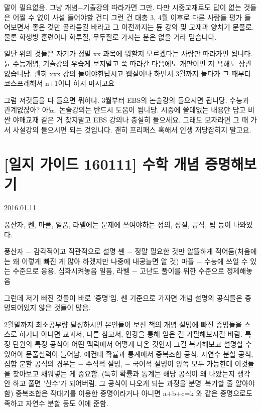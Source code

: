 말이 필요없음. 그냥 개념$-$기출강의 따라가면 그만.
다만 시중교재로도 답이 없는 것들은 어쩔 수 없이 사설 들어야할 건디
그런 건 대충 3, 4월 이후로 다른 사람들 평가 들어보면서 좋은 것만 골라듣길 바라고
그 이전까지는 듄 강의 및 교재과 양치기 문풀로.
물론 화생방 훈련이나 화투질, 무두질로 가시는 분은 없을 거라 믿습니다.
\vspace{5mm}

일단 위의 것들은 자기가 정말 xx 과목에 뭐할지 모르겠다는 사람만 따라가면 됩니다.
듄 수능개념, 기출강의 우습게 보지말고 쭉 따라간 다음에도 개판이면 저 욕해도 상관없습니당.
괜히 xxx 강의 들어야한답시고 웹질이나 하면서 3월까지 놀다가 그 때부터 코스프레해서 n+1이나 하지 마시고요
\vspace{5mm}

그럼 저것들을 다 들으면 뭐하냐.
3월부터 EBS의 논술강의 들으시면 됩니당.
수능과 관계없잖아?
아뇨. 논술강의는 반드시 도움이 됩니당.
시중에 쓸데없는 내용만 담고 비싼 야매교재 같은 거 찾지말고 EBS 강의나 충실히 들으세요.
그래도 모자라면 그 때 가서 사설강의 들으시면 되는 것입니다. 괜히 프리패스 혹해서 인생 저당잡히지 말고요.
\vspace{5mm}









\section{[일지 가이드 160111] 수학 개념 증명해보기}
\href{https://www.kockoc.com/Apoc/584086}{2016.01.11}

\vspace{5mm}

풍산자, 쎈, 마플, 일품, 라벨에는 문제에 쓰여야하는 정의, 성질, 공식, 팁 등이 나와있다.
\vspace{5mm}

풍산자 $-$ 감각적이고 직관적으로 설명
쎈 $-$ 정말 필요한 것만 알뜰하게 적어둠(처음에는 왜 이렇게 빠진 게 많아 하겠지만 나중에 내공늘면 알 것)
마플 $-$ 수능에 쓰일 수 있는 수준으로 응용, 심화시켜놓음
일품, 라벨 $-$ 고난도 풀이를 위한 수준으로 정제해놓음
\vspace{5mm}

그런데 저기 빠진 것들이 바로 '증명'임.
쎈 기준으로 가자면 개념 설명의 공식들은 증명되어있지 않은 것들이 많음.
\vspace{5mm}

2월말까지 최소공부량 달성하시면
본인들이 보신 책의 개념 설명에 빠진 증명들을 스스로 하거나 아니면 교과서, 다른 참고서, 인강을 통해 얻은 걸 가필해보시길 바람.
특정 단원의 특정 공식이 어떤 맥락에서 어떻게 나온 것인지 그걸 복기해보고 설명할 수 있어야 문풀실력이 늘어남.
예컨대 확률과 통계에서 중복조합 공식, 자연수 분할 공식, 집합 분할 공식의 경우는
$-$ 수식적 설명, $-$ 국어적 설명이 양쪽 모두 가능한데 이것들을 찾아보고 채워넣는 게 중요함.
(특히 확률과 통계는 해당 공식이 왜 나왔는지 생각 안 하고 풀면 '산수'가 되어버림. 그 공식이 나오게 되는 과정을 분명 복기할 줄 알아야 함)
중복조합은 작대기를 이용한 증명이라거나 아니면 a+b+c=k 와 같은 증명으로도 족하고 자연수 분할 등도 이에 준함.
\vspace{5mm}

